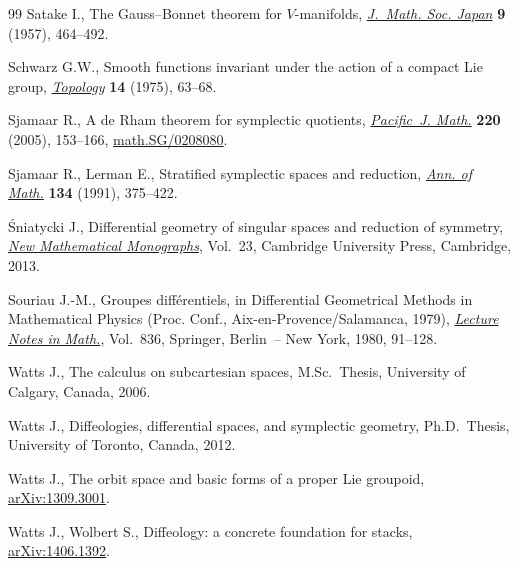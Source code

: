 \documentclass[pdftex]{sigma}
\numberwithin{equation}{section}
\begin{document}
\begin{thebibliography}{99}
Satake I., The {G}auss--{B}onnet theorem for {$V$}-manifolds, \href{http://doi.org/10.2969/jmsj/00940464}{\textit{J.~Math.
 Soc. Japan}} \textbf{9} (1957), 464--492.

Schwarz G.W., Smooth functions invariant under the action of a compact {L}ie
 group, \href{http://doi.org/10.1016/0040-9383(75)90036-1}{\textit{Topology}} \textbf{14} (1975), 63--68.

Sjamaar R., A de {R}ham theorem for symplectic quotients, \href{http://dx.doi.org/10.2140/pjm.2005.220.153}{\textit{Pacific~J.
 Math.}} \textbf{220} (2005), 153--166, \href{http://arxiv.org/abs/math.SG/0208080}{math.SG/0208080}.

Sjamaar R., Lerman E., Stratif\/ied symplectic spaces and reduction, \href{http://dx.doi.org/10.2307/2944350}{\textit{Ann.
 of Math.}} \textbf{134} (1991), 375--422.

{\'S}niatycki J., Dif\/ferential geometry of singular spaces and reduction of
 symmetry, \href{http://dx.doi.org/10.1017/CBO9781139136990}{\textit{New Mathematical Monographs}}, Vol.~23, Cambridge University
 Press, Cambridge, 2013.

Souriau J.-M., Groupes dif\/f\'erentiels, in Dif\/ferential Geometrical Methods in
 Mathematical Physics ({P}roc. {C}onf., {A}ix-en-{P}rovence/{S}alamanca,
 1979), \href{http://dx.doi.org/10.1007/BFb0089728}{\textit{Lecture Notes in Math.}}, Vol.~836, Springer, Berlin~-- New
 York, 1980, 91--128.

Watts J., The calculus on subcartesian spaces, {M.Sc.}~Thesis, University of
 Calgary, Canada, 2006.

Watts J., Dif\/feologies, dif\/ferential spaces, and symplectic geometry, Ph.D.~Thesis, {U}niversity of Toronto, Canada, 2012.

Watts J., The orbit space and basic forms of a proper Lie groupoid,
 \href{http://arxiv.org/abs/1309.3001}{arXiv:1309.3001}.

Watts J., Wolbert S., Dif\/feology: a concrete foundation for stacks,
 \href{http://arxiv.org/abs/1406.1392}{arXiv:1406.1392}.

\end{thebibliography}\LastPageEnding
\end{document}
